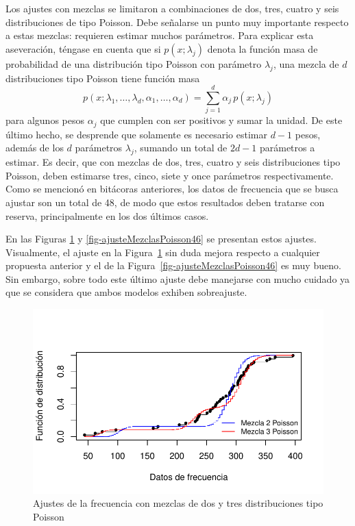 \documentclass[
  letterpaper,
  onepage,
  openany]{scrreprt}
\begin{document}
Los ajustes con mezclas se limitaron a combinaciones de dos, tres,
cuatro y seis distribuciones de tipo Poisson. Debe señalarse un punto
muy importante respecto a estas mezclas: requieren estimar muchos
parámetros. Para explicar esta aseveración, téngase en cuenta que si
\(p(x;\lambda_{j})\) denota la función masa de probabilidad de una
distribución tipo Poisson con parámetro \(\lambda_{j}\), una mezcla de
\(d\) distribuciones tipo Poisson tiene función masa \[
p(x;\lambda_{1},\dots, \lambda_{d}, \alpha_{1},\dots, \alpha_{d})=\sum_{j=1}^{d}
\alpha_{j}\,p(x;\lambda_{j})
\] para algunos pesos \(\alpha_{j}\) que cumplen con ser positivos y
sumar la unidad. De este último hecho, se desprende que solamente es
necesario estimar \(d-1\) pesos, además de los \(d\) parámetros
\(\lambda_{j}\), sumando un total de \(2d-1\) parámetros a estimar. Es
decir, que con mezclas de dos, tres, cuatro y seis distribuciones tipo
Poisson, deben estimarse tres, cinco, siete y once parámetros
respectivamente. Como se mencionó en bitácoras anteriores, los datos de
frecuencia que se busca ajustar son un total de 48, de modo que estos
resultados deben tratarse con reserva, principalmente en los dos últimos
casos.

En las Figuras \ref{fig-ajusteMezclasPoisson23} y
\ref{fig-ajusteMezclasPoisson46} se presentan estos ajustes.
Visualmente, el ajuste en la Figura~\ref{fig-ajusteMezclasPoisson23} sin
duda mejora respecto a cualquier propuesta anterior y el de la
Figura~\ref{fig-ajusteMezclasPoisson46} es muy bueno. Sin embargo, sobre
todo este último ajuste debe manejarse con mucho cuidado ya que se
considera que ambos modelos exhiben sobreajuste.

\begin{figure}[H]

\caption{\label{fig-ajusteMezclasPoisson23}Ajustes de la frecuencia con
mezclas de dos y tres distribuciones tipo Poisson}

{\centering \includegraphics{./Bit4_files/figure-pdf/fig-ajusteMezclasPoisson23-1.pdf}

}

\end{figure}
\end{document}
